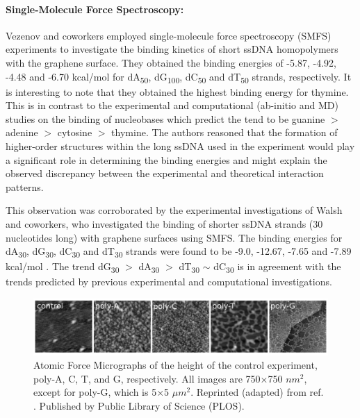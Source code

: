 \paragraph{Single-Molecule Force Spectroscopy:} Vezenov and coworkers employed single-molecule force spectroscopy (SMFS) experiments to investigate the binding kinetics of short ssDNA homopolymers with the graphene surface.\supercite{manohar_peeling_2008,iliafar_quantifying_2012} They obtained the binding energies of -5.87, -4.92, -4.48 and -6.70 kcal/mol for dA\textsubscript{50}, dG\textsubscript{100}, dC\textsubscript{50} and dT\textsubscript{50} strands, respectively. It is interesting to note that they obtained the highest binding energy for thymine.  This is in contrast to the experimental and computational (ab-initio and MD) studies on the binding of nucleobases which predict the tend to be guanine $>$ adenine $>$ cytosine $>$ thymine. The authors reasoned that the formation of higher-order structures within the long ssDNA used in the experiment would play a significant role in determining the binding energies and might explain the observed discrepancy between the experimental and theoretical interaction patterns.

This observation was corroborated by the experimental investigations of Walsh and coworkers, who investigated the binding of shorter ssDNA strands (30 nucleotides long) with graphene surfaces using SMFS. The binding energies for dA\textsubscript{30}, dG\textsubscript{30}, dC\textsubscript{30} and dT\textsubscript{30} strands were found to be -9.0, -12.67, -7.65 and -7.89 kcal/mol \supercite{hughes_adsorption_2017}. The trend dG\textsubscript{30} $>$ dA\textsubscript{30} $>$ dT\textsubscript{30} $\sim$ dC\textsubscript{30} is in agreement with the trends predicted by previous experimental and computational investigations.

\begin{figure}
    \centering
    \includegraphics[width=\textwidth]{Introduction/Figures/Figure12_crop.png}
    \caption[Atomic Force Micrographs of the height of the control experiment, poly-A, C, T, and G, respectively.]{Atomic Force Micrographs of the height of the control experiment, poly-A, C, T, and G, respectively. All images are 750×750 $nm^2$, except for poly-G, which is 5×5 $\mu m^2$. Reprinted (adapted) from ref. \supercite{akca_competing_2011}. Published by Public Library of Science (PLOS).}
    \label{fig:figure4}
\end{figure}

